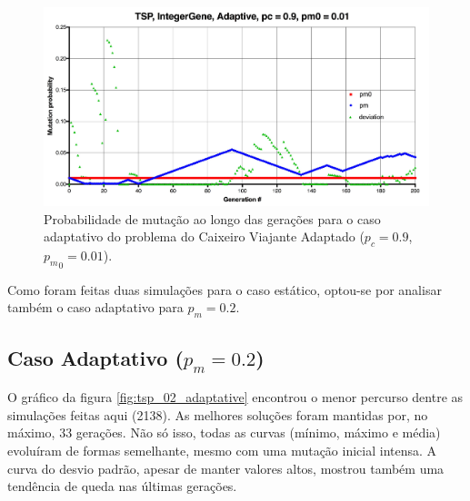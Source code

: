 \begin{figure}[ht!]
    \centering \includegraphics[width=1.0\textwidth]{tsp_001_adaptive_pm.jpg}
    \caption{Probabilidade de mutação ao longo das gerações para o caso adaptativo do problema do Caixeiro Viajante Adaptado ($p_c=0.9$, ${p_m}_0=0.01$).}
    \label{fig:tsp_001_adaptive_pm}
\end{figure}

Como foram feitas duas simulações para o caso estático, optou-se por analisar também o caso adaptativo para $p_m = 0.2$.

\subsection{Caso Adaptativo ($p_m = 0.2$)}

O gráfico da figura \ref{fig:tsp_02_adaptative} encontrou o menor percurso dentre as simulações feitas aqui (2138). As melhores soluções foram mantidas por, no máximo, 33 gerações. Não só isso, todas as curvas (mínimo, máximo e média) evoluíram de formas semelhante, mesmo com uma mutação inicial intensa. A curva do desvio padrão, apesar de manter valores altos, mostrou também uma tendência de queda nas últimas gerações.

